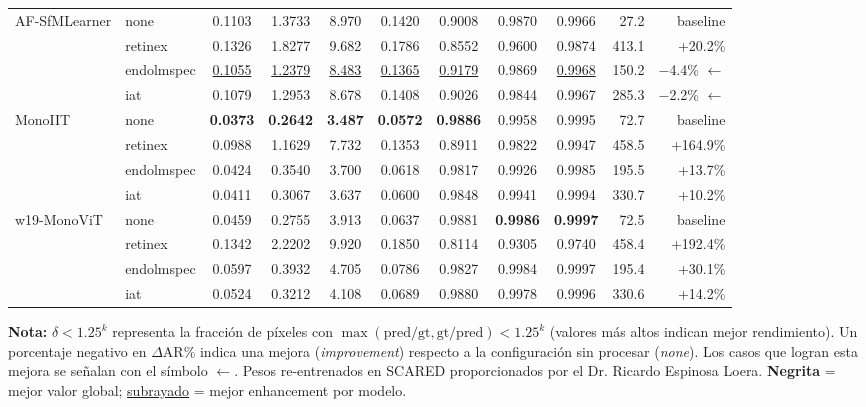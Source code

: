 \begin{table}[t]
\begin{tabular}{llcccccccrr}
\midrule
\multirow{4}{*}{AF-SfMLearner}
 & none       & 0.1103 & 1.3733 &  8.970 & 0.1420 & 0.9008 & 0.9870 & 0.9966 &  27.2 & baseline \\
 & retinex    & 0.1326 & 1.8277 &  9.682 & 0.1786 & 0.8552 & 0.9600 & 0.9874 & 413.1 & +20.2\% \\
 & endolmspec & \underline{0.1055} & \underline{1.2379} & \underline{8.483} & \underline{0.1365} & \underline{0.9179} & 0.9869 & \underline{0.9968} & 150.2 & $-$4.4\% $\leftarrow$ \\
 & iat        & 0.1079 & 1.2953 &  8.678 & 0.1408 & 0.9026 & 0.9844 & 0.9967 & 285.3 & $-$2.2\% $\leftarrow$ \\
\midrule
\multirow{4}{*}{MonoIIT}
 & none       & \textbf{0.0373} & \textbf{0.2642} & \textbf{3.487} & \textbf{0.0572} & \textbf{0.9886} & 0.9958 & 0.9995 &  72.7 & baseline \\
 & retinex    & 0.0988 & 1.1629 &  7.732 & 0.1353 & 0.8911 & 0.9822 & 0.9947 & 458.5 & +164.9\% \\
 & endolmspec & 0.0424 & 0.3540 &  3.700 & 0.0618 & 0.9817 & 0.9926 & 0.9985 & 195.5 & +13.7\% \\
 & iat        & 0.0411 & 0.3067 &  3.637 & 0.0600 & 0.9848 & 0.9941 & 0.9994 & 330.7 & +10.2\% \\
\midrule
\multirow{4}{*}{w19-MonoViT}
 & none       & 0.0459 & 0.2755 &  3.913 & 0.0637 & 0.9881 & \textbf{0.9986} & \textbf{0.9997} &  72.5 & baseline \\
 & retinex    & 0.1342 & 2.2202 &  9.920 & 0.1850 & 0.8114 & 0.9305 & 0.9740 & 458.4 & +192.4\% \\
 & endolmspec & 0.0597 & 0.3932 &  4.705 & 0.0786 & 0.9827 & 0.9984 & 0.9997 & 195.4 & +30.1\% \\
 & iat        & 0.0524 & 0.3212 &  4.108 & 0.0689 & 0.9880 & 0.9978 & 0.9996 & 330.6 & +14.2\% \\
\bottomrule
\end{tabular}

\vspace{2pt}
\footnotesize
\textbf{Nota:} $\delta < 1.25^k$ representa la fracción de píxeles con $\max(\text{pred}/\text{gt}, \text{gt}/\text{pred}) < 1.25^k$ (valores más altos indican mejor rendimiento). Un porcentaje negativo en $\Delta$AR\% indica una mejora (\emph{improvement}) respecto a la configuración sin procesar (\emph{none}). Los casos que logran esta mejora se señalan con el símbolo $\leftarrow$. Pesos re-entrenados en SCARED proporcionados por el Dr. Ricardo Espinosa Loera. \textbf{Negrita} = mejor valor global; \underline{subrayado} = mejor enhancement por modelo.
\end{table}

